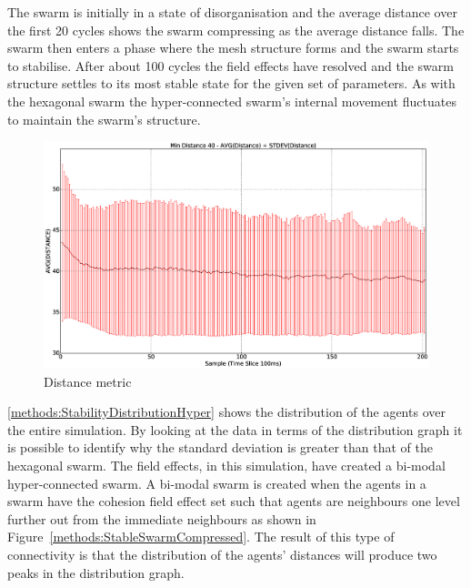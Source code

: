 The swarm is initially in a state of disorganisation and the average distance over the first 20 cycles shows the swarm compressing as the average distance falls. The swarm then enters a phase where the mesh structure forms and the swarm starts to stabilise. After about 100 cycles the field effects have resolved and the swarm structure settles to its most stable state for the given set of parameters. As with the hexagonal swarm the hyper-connected swarm's internal movement fluctuates to maintain the swarm's structure.
\begin{figure}[H]
\begin{center}
\includegraphics[width=13cm]{CHAPTER-5/figures/StabilityDistanceSwarm40-60}
\end{center}
\caption{Distance metric\label{methods:StabilityDistanceSwarm40-60}}
\end{figure}

\autoref{methods:StabilityDistributionHyper} shows the distribution of the agents over the entire simulation. By looking at the data in terms of the distribution graph it is possible to identify why the standard deviation is greater than that of the hexagonal swarm. The field effects, in this simulation, have created a bi-modal hyper-connected swarm. A bi-modal swarm is created when the agents in a swarm have the cohesion field effect set such that agents are neighbours one level further out from the immediate neighbours as shown in Figure~\ref{methods:StableSwarmCompressed}. The result of this type of connectivity is that the distribution of the agents' distances will produce two peaks in the distribution graph.

